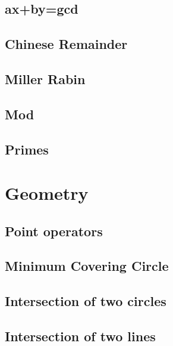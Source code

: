 \documentclass[10pt,twocolumn,oneside]{article}
\begin{document}
\subsection{ax+by=gcd}


\subsection{Chinese Remainder}

\subsection{Miller Rabin}


\subsection{Mod}


\subsection{Primes}


\section{Geometry}

\subsection{Point operators}


\subsection{Minimum Covering Circle}


\subsection{Intersection of two circles}


\subsection{Intersection of two lines}

\end{document}
